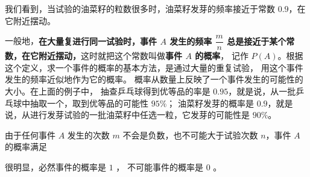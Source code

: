 我们看到，当试验的油菜籽的粒数很多时，油菜籽发芽的频率接近于常数 $0.9$，在它附近摆动。

一般地，\textbf{在大量复进行同一试验时，事件 $A$ 发生的频率 $\dfrac{m}{n}$
总是接近于某个常数，在它附近摆动，}这时就把这个常数叫做\textbf{事件 $A$ 的概率}，
记作 $P(A)$\footnotemark 。根据这个定义，求一个事件的概率的基本方法，是通过大量的重复试验，
用这个事件发生的频率近似地作为它的概率。 概率从数量上反映了一个事件发生的可能性的大小。在上面的例子中，
抽查乒乓球得到优等品的率是 $0.95$，就是说，从一批乒乓球中抽取一个，取到优等品的可能性 $95\%$；
油菜籽发芽的概率是 $0.9$，就是说，从进行发芽试验的一批油菜籽中任选一粒，它发芽的可能性是 $90\%$。


由于任何事件 $A$ 发生的次数 $m$ 不会是负数，也不可能大于试验次数 $n$，事件 $A$ 的概率满足
\begin{center}
\end{center}


很明显，必然事件的概率是 $1$ ， 不可能事件的概率是 $0$ 。


